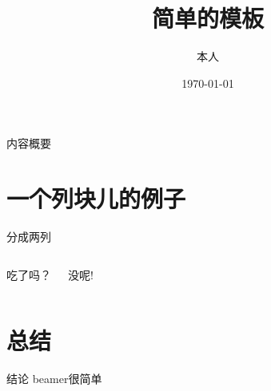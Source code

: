 \documentclass[compress]{beamer}
\title{简单的模板}
\author{本人}
\institute{家里蹲大学}
\date{\today}
\begin{document}
\frame{\titlepage}

\begin{frame}{内容概要}
\tableofcontents[hideallsubsections]
\end{frame}

\section{一个列块儿的例子}
\begin{frame}{分成两列}

\begin{columns}

吃了吗？

没呢!
\end{columns}
\end{frame}


\section{总结}
\begin{frame}{结论}
beamer很简单
\end{frame}
\end{document}
